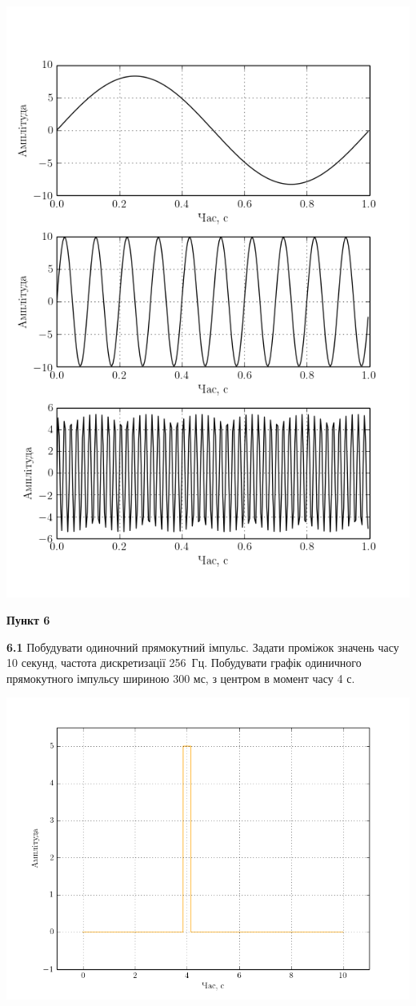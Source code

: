 \documentclass[a4paper,12pt]{article}
\begin{document}
\begin{center}
\includegraphics[height = 11.5 cm,width=13 cm]{5r.png}
\end{center}
\begin{center}
\textbf{Пункт 6}\par
\end{center}

\textbf{6.1} Побудувати одиночний прямокутний імпульс. Задати проміжок значень часу 10 секунд, частота дискретизації 256 Гц. Побудувати графік одиничного прямокутного імпульсу шириною 300 мс, з центром в момент часу 4 с.\par



\begin{center}
\includegraphics[height = 11.5 cm,width=15 cm]{6.1.png}
\end{center}
\end{document}
